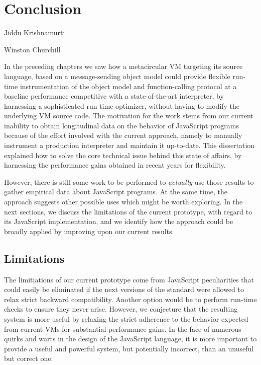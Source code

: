 \chapter{Conclusion}

{Jiddu Krishnamurti}

{Winston Churchill}


In the preceding chapters we saw how a metacircular VM targeting its source
language, based on a message-sending object model could provide flexible
run-time instrumentation of the object model and function-calling protocol at a
baseline performance competitive with a state-of-the-art interpreter, by
harnessing a sophisticated run-time optimizer, without having to modify the
underlying VM source code. The motivation for the work stems from our current
inability to obtain longitudinal data on the behavior of JavaScript programs
because of the effort involved with the current approach, namely to manually
instrument a production interpreter and maintain it up-to-date. This
dissertation explained how to solve the core technical issue behind this state
of affairs, by harnessing the performance gains obtained in recent years for
flexibility.

However, there is still some work to be performed to \textit{actually} use
those results to gather empirical data about JavaScript programs. At the same
time, the approach suggests other possible uses which might be worth exploring.
In the next sections, we discuss the limitations of the current prototype, with
regard to its JavaScript implementation, and we identify how the approach could
be broadly applied by improving upon our current results.

\section{Limitations}

The limitiations of our current prototype come from JavaScript peculiarities
that could easily be eliminated if the next versions of the standard were
allowed to relax strict backward compatibility. Another option would be
to perform run-time checks to ensure they never arise.  However, we conjecture
that the resulting system is more useful by relaxing the strict adherence to
the behavior expected from current VMs for substantial performance gains.  In
the face of numerous quirks and warts in the design of the JavaScript language,
it is more important to provide a useful and powerful system, but potentially
incorrect, than an unuseful but correct one.

